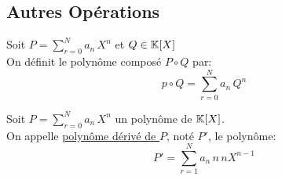 \documentclass[12pt,twoside,a4paper]{article}
\begin{document}
		\subsection{Autres Opérations}
			\begin{defi}
				Soit $P=\sum\limits_{r=0}^Na_n\,X^{n}$ et $Q\in\mathbb{K}[X]$\\
				On définit le polynôme composé $P\circ Q$ par:
				$$p\circ Q=\sum\limits_{r=0}^Na_n\,Q^{n}$$
			\end{defi}
			\begin{defi}
				Soit $P=\sum\limits_{r=0}^Na_n\,X^{n}$ un polynôme de $\mathbb{K}[X]$.\\
				On appelle \underline{polynôme dérivé de $P$}, noté $P'$, le polynôme:
				$$P'=\sum\limits_{r=1}^Na_n\,n\,nX^{n-1} $$
			\end{defi}
\end{document}
